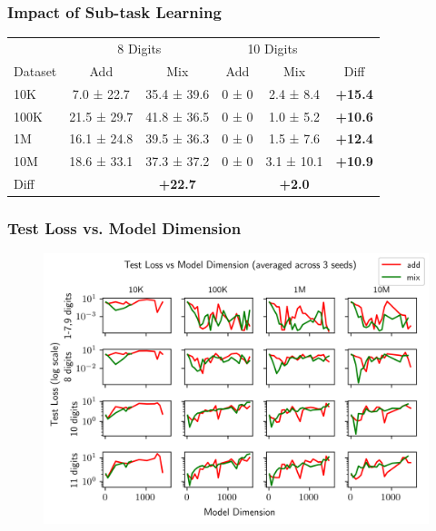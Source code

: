 \documentclass[14pt,aspectratio=169]{beamer}
\theoremstyle{remark}
\begin{document}
\begin{frame}
    \frametitle{Impact of Sub-task Learning}
    \begin{table}
        \centering
        \begin{tabular}{lccccc}
            \toprule
                    & \multicolumn{2}{c}{8 Digits} & \multicolumn{2}{c}{10 Digits}                                          \\
            Dataset & Add                          & Mix                           & Add   & Mix           & Diff           \\
            \midrule
            10K     & 7.0 ± 22.7                   & 35.4 ± 39.6                   & 0 ± 0 & 2.4 ± 8.4     & \textbf{+15.4} \\
            100K    & 21.5 ± 29.7                  & 41.8 ± 36.5                   & 0 ± 0 & 1.0 ± 5.2     & \textbf{+10.6} \\
            1M      & 16.1 ± 24.8                  & 39.5 ± 36.3                   & 0 ± 0 & 1.5 ± 7.6     & \textbf{+12.4} \\
            10M     & 18.6 ± 33.1                  & 37.3 ± 37.2                   & 0 ± 0 & 3.1 ± 10.1    & \textbf{+10.9} \\
            \midrule
            Diff    &                              & \textbf{+22.7}                &       & \textbf{+2.0} &                \\
            \bottomrule
        \end{tabular}
    \end{table}
\end{frame}

\begin{frame}
    \frametitle{Test Loss vs. Model Dimension}
    \begin{figure}
        \centering
        \includegraphics[width=0.6\linewidth]{fig/exp_27_test_loss_vs_n_embd.png}
    \end{figure}
\end{frame}
\end{document}
